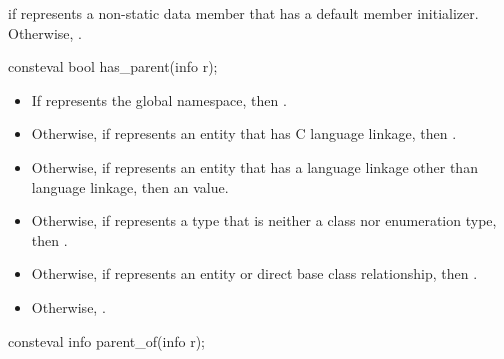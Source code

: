 \begin{itemdescr}
\pnum
\returns
{} if  represents a non-static data member
that has a default member initializer.
Otherwise, .
\end{itemdescr}

%
\begin{itemdecl}
consteval bool has_parent(info r);
\end{itemdecl}

\begin{itemdescr}
\pnum
\returns
\begin{itemize}
\item
  If  represents the global namespace,
  then .
\item
  Otherwise, if  represents an entity that has C language linkage,
  then .
\item
  Otherwise, if  represents an entity that has a
  language linkage other than \Cpp{} language linkage,
  then an
  value.
\item
  Otherwise, if  represents a type that is neither a class nor enumeration type,
  then .
\item
  Otherwise, if  represents an entity or direct base class relationship,
  then .
\item
  Otherwise, .
\end{itemize}
\end{itemdescr}

%
\begin{itemdecl}
consteval info parent_of(info r);
\end{itemdecl}

